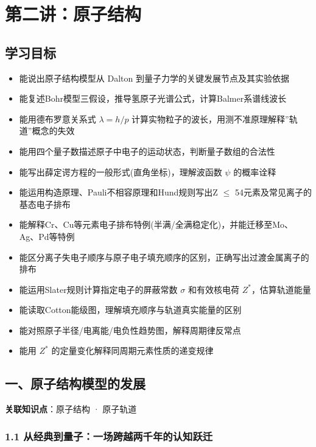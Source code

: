 \section{第二讲：原子结构}\label{ux7b2cux4e8cux8bb2ux539fux5b50ux7ed3ux6784}

\subsection{学习目标}\label{ux5b66ux4e60ux76eeux6807}

\begin{itemize}
\tightlist
\item
  能说出原子结构模型从 Dalton 到量子力学的关键发展节点及其实验依据
\item
  能复述Bohr模型三假设，推导氢原子光谱公式，计算Balmer系谱线波长
\item
  能用德布罗意关系式 \(\lambda = h/p\) 计算实物粒子的波长，用测不准原理解释''轨道''概念的失效
\item
  能用四个量子数描述原子中电子的运动状态，判断量子数组的合法性
\item
  能写出薛定谔方程的一般形式(直角坐标)，理解波函数 \(\psi\) 的概率诠释
\item
  能运用构造原理、Pauli不相容原理和Hund规则写出Z \(\leq\) 54元素及常见离子的基态电子排布
\item
  能解释Cr、Cu等元素电子排布特例(半满/全满稳定化)，并能迁移至Mo、Ag、Pd等特例
\item
  能区分离子失电子顺序与原子电子填充顺序的区别，正确写出过渡金属离子的排布
\item
  能运用Slater规则计算指定电子的屏蔽常数 \(\sigma\) 和有效核电荷 \(Z^*\)，估算轨道能量
\item
  能读取Cotton能级图，理解填充顺序与轨道真实能量的区别
\item
  能对照原子半径/电离能/电负性趋势图，解释周期律反常点
\item
  能用 \(Z^*\) 的定量变化解释同周期元素性质的递变规律
\end{itemize}

\subsection{一、原子结构模型的发展}\label{ux4e00ux539fux5b50ux7ed3ux6784ux6a21ux578bux7684ux53d1ux5c55}

\textbf{关联知识点}：原子结构 · 原子轨道

\subsubsection{1.1 从经典到量子：一场跨越两千年的认知跃迁}\label{ux4eceux7ecfux5178ux5230ux91cfux5b50ux4e00ux573aux8de8ux8d8aux4e24ux5343ux5e74ux7684ux8ba4ux77e5ux8dc3ux8fc1}

